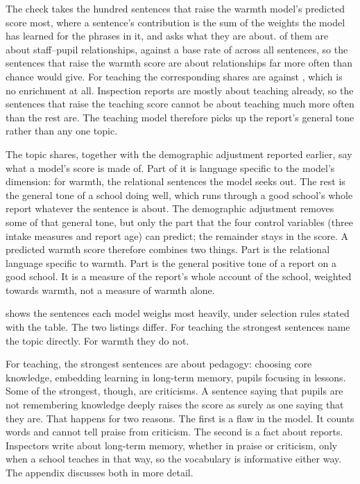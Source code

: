 The check takes the hundred sentences that raise the warmth model's predicted score most, where a sentence's contribution is the sum of the weights the model has learned for the phrases in it, and asks what they are about. \WarmTopShare{} of them are about staff--pupil relationships, against a base rate of \WarmBaseShare{} across all sentences, so the sentences that raise the warmth score are about relationships far more often than chance would give. For teaching the corresponding shares are \TeachTopShare{} against \TeachBaseShare{}, which is no enrichment at all. Inspection reports are mostly about teaching already, so the sentences that raise the teaching score cannot be about teaching much more often than the rest are. The teaching model therefore picks up the report's general tone rather than any one topic.

The topic shares, together with the demographic adjustment reported earlier, say what a model's score is made of. Part of it is language specific to the model's dimension: for warmth, the relational sentences the model seeks out. The rest is the general tone of a school doing well, which runs through a good school's whole report whatever the sentence is about. The demographic adjustment removes some of that general tone, but only the part that the four control variables (three intake measures and report age) can predict; the remainder stays in the score. A predicted warmth score therefore combines two things. Part is the relational language specific to warmth. Part is the general positive tone of a report on a good school. It is a measure of the report's whole account of the school, weighted towards warmth, not a measure of warmth alone.

 shows the sentences each model weighs most heavily, under selection rules
stated with the table. The two listings differ. For teaching the strongest sentences name the
topic directly. For warmth they do not.

For teaching, the strongest sentences are about pedagogy: choosing core knowledge, embedding
learning in long-term memory, pupils focusing in lessons. Some of the strongest, though, are
criticisms. A sentence saying that pupils are not remembering knowledge deeply raises the score
as surely as one saying that they are. That happens for two reasons. The first is a flaw in the model. It counts words and cannot tell praise from
criticism. The second is a fact about reports. Inspectors write about long-term memory, whether in praise or criticism, only when a school teaches in that way, so the vocabulary is informative either way. The appendix discusses both in more detail.

